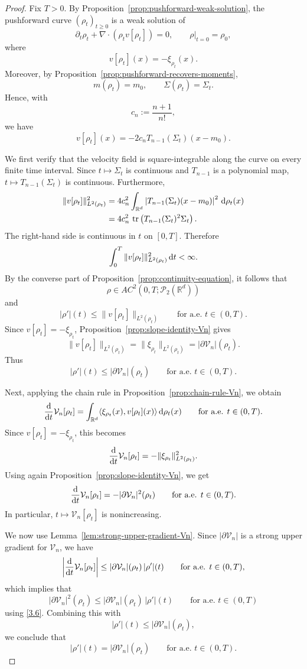 \documentclass[11pt,reqno]{amsart}
\numberwithin{figure}{section}
\def\d {{\partial}}
\def\d{\mathrm{d}}
\renewcommand{\d}{  {\textup{d}} }
\begin{document}
\begin{proof}
Fix $T>0$. By Proposition~\ref{prop:pushforward-weak-solution}, the
pushforward curve $(\rho_t)_{t\ge0}$ is a weak solution of
\[
\partial_t\rho_t+\nabla\cdot(\rho_t v[\rho_t])=0,
\qquad
\rho|_{t=0}=\rho_0,
\]
where
\[
v[\rho_t](x)=-\xi_{\rho_t}(x).
\]
Moreover, by Proposition~\ref{prop:pushforward-recovers-moments},
\[
m(\rho_t)=m_0,
\qquad
\Sigma(\rho_t)=\Sigma_t .
\]
Hence, with
\[
c_n:=\frac{n+1}{n!},
\]
we have
\[
v[\rho_t](x)
=
-2c_nT_{n-1}(\Sigma_t)(x-m_0).
\]

We first verify that the velocity field is square-integrable along the curve
on every finite time interval. Since $t\mapsto\Sigma_t$ is continuous and
$T_{n-1}$ is a polynomial map, $t\mapsto T_{n-1}(\Sigma_t)$ is continuous.
Furthermore,
\[
\begin{aligned}
\|v[\rho_t]\|_{L^2(\rho_t)}^2
&=
4c_n^2
\int_{\mathbb R^d}
\left|T_{n-1}(\Sigma_t)(x-m_0)\right|^2\,\d\rho_t(x) \\
&=
4c_n^2\,
\operatorname{tr}
\left(
T_{n-1}(\Sigma_t)^2\Sigma_t
\right).
\end{aligned}
\]
The right-hand side is continuous in $t$ on $[0,T]$. Therefore
\[
\int_0^T
\|v[\rho_t]\|_{L^2(\rho_t)}^2\,\d t
<\infty .
\]
By the converse part of Proposition~\ref{prop:continuity-equation}, it follows that
\[
\rho\in AC^2(0,T;\mathcal P_2(\mathbb R^d))
\]
and
\[
|\rho'|(t)\le \|v[\rho_t]\|_{L^2(\rho_t)}
\qquad\text{for a.e. }t\in(0,T).
\]
Since $v[\rho_t]=-\xi_{\rho_t}$, Proposition~\ref{prop:slope-identity-Vn} gives
\[
\|v[\rho_t]\|_{L^2(\rho_t)}
=
\|\xi_{\rho_t}\|_{L^2(\rho_t)}
=
|\partial\mathcal V_n|(\rho_t).
\]
Thus
\[
|\rho'|(t)
\le
|\partial\mathcal V_n|(\rho_t)
\qquad\text{for a.e. }t\in(0,T).
\]

Next, applying the chain rule in Proposition~\ref{prop:chain-rule-Vn}, we obtain
\[
\frac{\d}{\d t}\mathcal V_n[\rho_t]
=
\int_{\mathbb R^d}
\langle \xi_{\rho_t}(x),v[\rho_t](x)\rangle\,\d\rho_t(x)
\qquad\text{for a.e. }t\in(0,T).
\]
Since $v[\rho_t]=-\xi_{\rho_t}$, this becomes
\[
\frac{\d}{\d t}\mathcal V_n[\rho_t]
=
-\|\xi_{\rho_t}\|_{L^2(\rho_t)}^2.
\]
Using again Proposition~\ref{prop:slope-identity-Vn}, we get
\begin{equation}\label{3.6}
    \frac{\d}{\d t}\mathcal V_n[\rho_t]
=
-|\partial\mathcal V_n|^2(\rho_t)
\qquad\text{for a.e. }t\in(0,T).
\end{equation}
In particular, $t\mapsto\mathcal V_n[\rho_t]$ is nonincreasing.

We now use Lemma~\ref{lem:strong-upper-gradient-Vn}. Since
$|\partial\mathcal V_n|$ is a strong upper gradient for $\mathcal V_n$, we have
\[
\left|
\frac{\d}{\d t}\mathcal V_n[\rho_t]
\right|
\le
|\partial\mathcal V_n|(\rho_t)\,|\rho'|(t)
\qquad\text{for a.e. }t\in(0,T),
\]
which implies that
\[
|\partial\mathcal V_n|^2(\rho_t)
\le
|\partial\mathcal V_n|(\rho_t)\,|\rho'|(t)
\qquad\text{for a.e. }t\in(0,T)
\]
 using \eqref{3.6}. Combining this with
\[
|\rho'|(t)\le |\partial\mathcal V_n|(\rho_t),
\]
we conclude that
\[
|\rho'|(t)=|\partial\mathcal V_n|(\rho_t)
\qquad\text{for a.e. }t\in(0,T).
\]



\end{proof}
\end{document}
